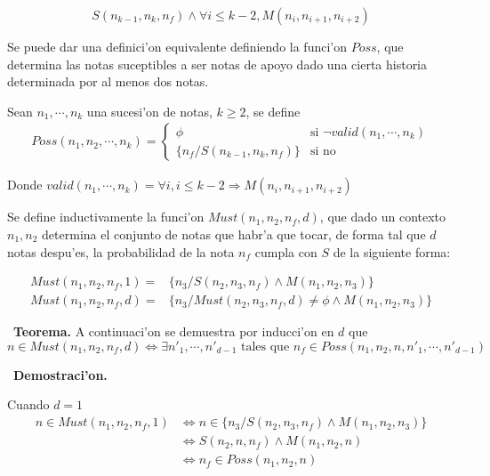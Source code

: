 $$  S(n_{k-1}, n_k, n_f) \land \forall i\leq k-2, M(n_i, n_{i+1}, n_{i+2})$$

Se puede dar una definici'on equivalente definiendo la funci'on $Poss$, que determina las notas suceptibles a ser notas de apoyo dado una cierta historia determinada por al menos dos notas.

\begin{definition}
\label{def:poss}
Sean $n_1, \cdots, n_k$ una sucesi'on de notas, $k\geq2$, se define
\begin{align*}
Poss(n_1, n_2, \cdots, n_k)= \left\{
 \begin{array}{rl}
  \phi & \text{si } \neg valid(n_1, \cdots, n_k) \\ %
   \{n_f / S(n_{k-1}, n_k, n_f)\} & \text{si no}
 \end{array} \right.
\end{align*}

Donde $valid(n_1, \cdots, n_k) = \forall i, i\leq k-2 \Rightarrow M(n_i, n_{i+1}, n_{i+2})$
\end{definition}

Se define inductivamente la funci'on $Must(n_1, n_2, n_f, d)$, que dado un contexto $n_1, n_2$ determina el conjunto de notas que habr'a que tocar, de forma tal
que $d$ notas despu'es, la probabilidad de la nota $n_f$ cumpla con $S$ de la siguiente forma:
\begin{definition}
\label{def:must}
\begin{align*}
Must(n_1, n_2, n_f, 1)=& \{n_3/ S(n_2, n_3, n_f) \land M(n_1, n_2, n_3)\}\\
Must(n_1, n_2, n_f, d)=& \{n_3/ Must(n_2, n_3, n_f, d) \neq \phi \land M(n_1,n_2, n_3)\}
\end{align*}
\end{definition}


\ \newline \textbf{Teorema.}
A continuaci'on se demuestra por inducci'on en $d$ que 
$$n \in Must(n_1, n_2, n_f, d) \Leftrightarrow \exists n'_1, \cdots, n'_{d-1} \text{ tales que } n_f \in Poss(n_1, n_2, n, n'_1, \cdots, n'_{d-1})$$

\ \newline \textbf{Demostraci'on.}

Cuando $d=1$
\begin{align*}
n \in Must(n_1, n_2, n_f, 1)   & \Leftrightarrow n \in \{n_3/ S(n_2, n_3, n_f) \land M(n_1, n_2, n_3)\} \\
                               & \Leftrightarrow S(n_2, n, n_f) \land M(n_1, n_2, n)   \\
                               & \Leftrightarrow n_f \in Poss(n_1, n_2, n)
\end{align*}

